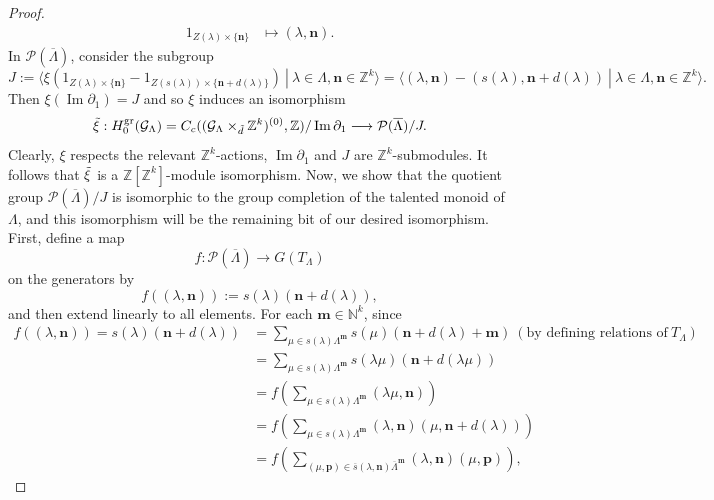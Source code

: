 \documentclass[12pt]{amsart}
\newcommand{\N}{\mathbf{n}}
\newcommand{\M}{\mathbf{m}}
\theoremstyle{definition}
\theoremstyle{remark}
\newcommand{\image}{\operatorname{Im}}
\newcommand{\gr}{\operatorname{gr}}
\begin{document}
\begin{proof}
\begin{align*}
1_{Z(\lambda)\times \{\N\}}&\longmapsto (\lambda,\N).
\end{align*}
In $\mathcal{P}(\overline{\Lambda})$, consider the subgroup \[J:=\langle \xi(1_{Z(\lambda)\times\{\N\}}-1_{Z(s(\lambda))\times \{\N+d(\lambda)\}})~|~\lambda\in \Lambda,\N\in \mathbb{Z}^k \rangle=\langle (\lambda,\N)-(s(\lambda),\N+d(\lambda))~|~\lambda\in \Lambda,\N\in \mathbb{Z}^k\rangle.\] Then $\xi(\image \partial_1)=J$ and so $\xi$ induces an isomorphism \[\Tilde{\xi}:H_0^{\gr}(\mathcal{G}_\Lambda)=C_c((\mathcal{G}_\Lambda\times_{\Tilde{d}}\mathbb{Z}^k)^{(0)},\mathbb{Z})/\image \partial_1 \longrightarrow \mathcal{P}(\overline{\Lambda})/J.\] Clearly, $\xi$ respects the relevant $\mathbb{Z}^k$-actions, $\image \partial_1$ and $J$ are $\mathbb{Z}^k$-submodules. It follows that $\Tilde{\xi}$ is a $\mathbb{Z}[\mathbb{Z}^k]$-module isomorphism. Now, we show that the quotient group $\mathcal{P}(\overline{\Lambda})/J$ is isomorphic to the group completion of the talented monoid of $\Lambda$, and this isomorphism will be the remaining bit of our desired isomorphism. First, define a map \[f:\mathcal{P}(\overline{\Lambda})\longrightarrow G(T_\Lambda)\] on the generators by \[f((\lambda,\N)):=s(\lambda)(\N+d(\lambda)),\] and then extend linearly to all elements. For each $\M\in \mathbb{N}^k$, since 
\begin{align*}
f((\lambda,\N))=s(\lambda)(\N+d(\lambda))&=\displaystyle{\sum_{\mu\in s(\lambda)\Lambda^\M}}s(\mu)(\N+d(\lambda)+\M) ~(\text{by defining relations of}~ T_\Lambda)\\
&=\displaystyle{\sum_{\mu\in s(\lambda)\Lambda^\M}}s(\lambda\mu)(\N+d(\lambda\mu))\\
&=f\left(\displaystyle{\sum_{\mu\in s(\lambda)\Lambda^\M}} (\lambda\mu,\N)\right)\\
&=f\left(\displaystyle{\sum_{\mu\in s(\lambda)\Lambda^\M}} (\lambda,\N)(\mu,\N+d(\lambda))\right)\\
&=f\left(\displaystyle{\sum_{(\mu,\mathbf{p})\in \overline{s}(\lambda,\N)\overline{\Lambda}^\M}} (\lambda,\N)(\mu,\mathbf{p})\right),
\end{align*}

\end{proof}
\end{document}
